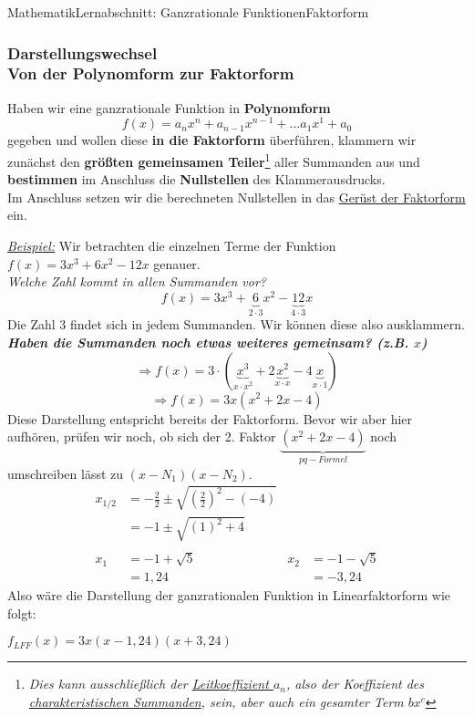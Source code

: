 \documentclass[11pt,twocolumn,oneside,openany,headings=optiontotoc,11pt,numbers=noenddot]{article}
\begin{document}
\begin{worksheet}{Mathematik}{Lernabschnitt: Ganzrationale Funktionen}{Faktorform}
		\subsubsection{Darstellungswechsel\\Von der Polynomform zur Faktorform}
		Haben wir eine ganzrationale Funktion in \textbf{Polynomform} \[f(x) = a_nx^n + a_{n-1}x^{n-1} + \ldots a_1x^1 + a_0\] gegeben und wollen diese \textbf{in die Faktorform} überführen, klammern wir zunächst den \textbf{größten gemeinsamen Teiler}\footnote{\textit{Dies kann ausschließlich der \underline{Leitkoeffizient \(a_n\)}, also der Koeffizient des \underline{charakteristischen Summanden}, sein, aber auch ein gesamter Term \(bx^c\)}} aller Summanden aus und \textbf{bestimmen} im Anschluss die \textbf{Nullstellen} des Klammerausdrucks.\\
		Im Anschluss setzen wir die berechneten Nullstellen in das \underline{Gerüst der Faktorform} ein.\\
		\par\noindent
		\underline{\textit{Beispiel:}} Wir betrachten die einzelnen Terme der Funktion \(f(x) = 3x^3 + 6x^2 -12x\) genauer.\\
		\textit{Welche Zahl kommt in allen Summanden vor?}
		\[f(x) = 3x^3 + \underbrace{6}_{2\cdot{}3}x^2 - \underbrace{12}_{4\cdot{}3}x\]
		Die Zahl \(3\) findet sich in jedem Summanden. Wir können diese also ausklammern. \textit{\textbf{\textit{Haben die Summanden noch etwas weiteres gemeinsam? (z.B. \(x\))}}}
		\[\Rightarrow f(x) = 3\cdot{}(\underbrace{x^3}_{x\cdot{}x^2} +2\underbrace{x^2}_{x\cdot{}x} -4\underbrace{x}_{x\cdot{}1})\]
		\[\Rightarrow f(x) = 3x(x^2 +2x -4)\]
		Diese Darstellung entspricht bereits der Faktorform. Bevor wir aber hier aufhören, prüfen wir noch, ob sich der 2. Faktor \(\underbrace{(x^2+2x-4)}_{pq-Formel}\) noch umschreiben lässt zu \((x-N_1)(x-N_2)\).\\
		\begin{align*}
			x_{1/2} & = -\frac{2}{2} \pm \sqrt{\left(\frac{2}{2}\right)^2 - (-4)}\\
			& = -1 \pm \sqrt{(1)^2 + 4}\\
			\\
			x_1 & = -1 + \sqrt{5} & x_2 & = -1 - \sqrt{5}\\
			& = 1,24 & & = -3,24
		\end{align*}
		Also wäre die Darstellung der ganzrationalen Funktion in Linearfaktorform wie folgt:
		\begin{center}
			\colorbox{green!10}{\(f_{LFF}(x) = 3x(x-1,24)(x+3,24)\)}
		\end{center}
	\end{worksheet}
\end{document}
